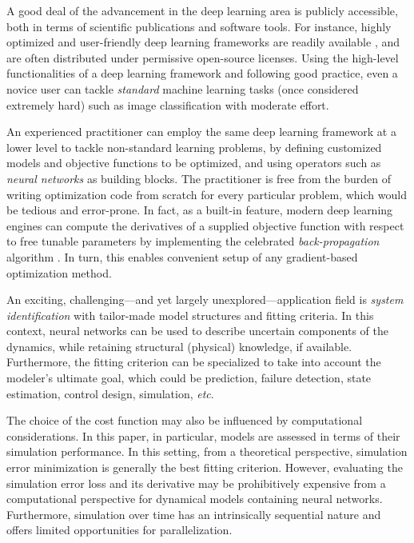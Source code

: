 \documentclass{article} %
\begin{document}
A good deal of the advancement in the deep learning area is publicly accessible, both in terms of scientific publications and software tools.
For instance, highly optimized and user-friendly deep learning frameworks are readily available \citep{paszke:2017automatic, tensorflow2015-whitepaper-short}, and are often distributed under permissive open-source licenses.
Using the high-level functionalities of a deep learning framework and following good practice, even a novice user can tackle  \emph{standard}  machine learning tasks (once considered extremely hard) such as image classification with moderate effort. 
 
 
An experienced practitioner can employ the same deep learning framework at a lower level to tackle non-standard learning problems, by defining customized models and objective functions to be optimized, and using operators such as \emph{neural networks} as building blocks. 
The practitioner is free from the burden of writing optimization code from scratch for every particular problem, which would be tedious and error-prone.
In fact, as a built-in feature, modern deep learning engines can compute the derivatives of a supplied objective function with respect to free tunable parameters by implementing the celebrated \emph{back-propagation} algorithm \citep{rumelhart1988learning}. In turn, this enables convenient setup of any gradient-based optimization method.

An exciting, challenging---and yet largely unexplored---application field is \emph{system identification} with tailor-made model structures and fitting criteria. In this context, neural networks can be used to describe uncertain components of the  dynamics, while retaining structural (physical) knowledge, if available. Furthermore, the fitting criterion can be specialized to take into account the modeler's ultimate goal, which could be prediction, failure detection, state estimation, control design, simulation, \emph{etc}.  

The choice of the cost function may also be influenced by computational considerations. 
In this paper, in particular, models are assessed in terms of their simulation performance. In this setting, from a theoretical perspective, simulation error minimization is generally the best fitting criterion. However, evaluating the simulation error loss and its derivative may be prohibitively expensive from a computational perspective for dynamical models containing neural networks. Furthermore, simulation over time has an intrinsically sequential nature and offers limited opportunities for parallelization.
\end{document}
